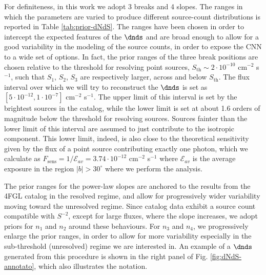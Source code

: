 For definiteness, in this work we adopt 3 breaks and 4 slopes. The ranges in which the parameters are varied to produce different source-count distributions is reported in Table \ref{tab:prior-dNdS}. The ranges have been chosen in order to intercept the expected features of the $\dnds$ and are broad enough to allow for a good variability in the modeling of the source counts, in order to expose the CNN to a wide set of options. In fact, the prior ranges of the three break positions are chosen relative to the \fermi threshold for resolving point sources, $S_\textrm{th} \sim 2 \cdot 10^{-10}$ cm$^{-2}$ s$^{-1}$, such that $S_1$, $S_2$, $S_3$ are respectively larger, across and below $S_\textrm{th}$. The flux interval over which we will try to reconstruct the $\dnds$ is set as $[5 \cdot 10^{-12}, 1 \cdot 10^{-7}]$ cm$^{-2}$ s$^{-1}$. The upper limit of this interval is set by the brightest sources in the catalog, while the lower limit is set at about 1.6 orders of magnitude below the \fermi threshold for resolving sources. Sources fainter than the lower limit of this interval are assumed to just contribute to the isotropic component.
{  This lower limit, indeed, is also close to the theoretical sensitivity given by the flux of a point source contributing exactly one photon, which we calculate as $F_\textrm{sens}= 1/\mathcal{E}_{av}=3.74 \cdot 10^{-12}$ cm$^{-2}$ s$^{-1}$  where $\mathcal{E}_{av}$ is the average exposure in the region $|b|>30^\circ$ where we perform the analysis.}





The prior ranges for the power-law slopes are anchored to the results from the 4FGL catalog in the resolved regime, and allow for progressively wider variability moving toward the unresolved regime. Since catalog data exhibit a source count compatible with $S^{-2}$, except for large fluxes, where the slope increases, we adopt priors for $n_1$ and $n_2$ around these behaviours. For $n_3$ and $n_4$, we progressively enlarge the prior ranges, in order to allow for more variability especially in the sub-threshold (unresolved) regime we are interested in. An example of a $\dnds$ generated from this procedure is shown in the right panel of Fig. \ref{fig:dNdS-annotato}, which also illustrates the notation.

